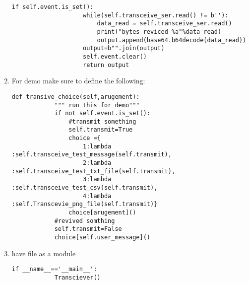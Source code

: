 \begin{enumerate}
\begin{lstlisting}[style=mystyle]
                if self.event.is_set():
                    while(self.transceive_ser.read() != b''):
                        data_read = self.transceive_ser.read()
                        print("bytes reviced %a"%data_read)
                        output.append(base64.b64decode(data_read))
                    output=b"".join(output)
                    self.event.clear()
                    return output
    \end{lstlisting}
    \item For demo make sure to define the following:
    \begin{lstlisting}[style=mystyle]
        def transive_choice(self,arugement):
            """ run this for demo"""
            if not self.event.is_set():
                #transmit something
                self.transmit=True
                choice ={
                    1:lambda :self.transceive_test_message(self.transmit),
                    2:lambda :self.transceive_test_txt_file(self.transmit),
                    3:lambda :self.transceive_test_csv(self.transmit),
                    4:lambda :self.Transcevie_png_file(self.transmit)}
                choice[arugement]()
            #revived somthing
            self.transmit=False
            choice[self.user_message]()
    \end{lstlisting}
    \item have file as a module
    \begin{lstlisting}[style=mystyle]
        if __name__=='__main__':
	        Transciever()
            
    \end{lstlisting}
\end{enumerate}
